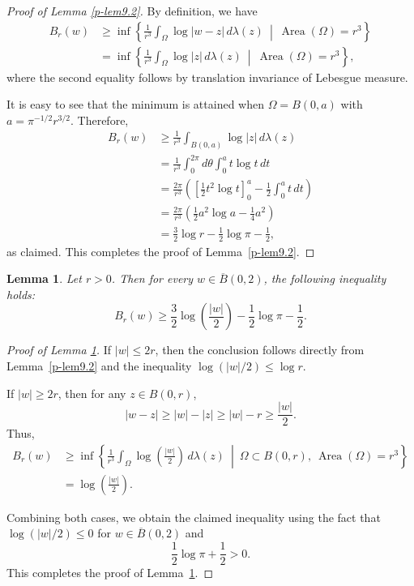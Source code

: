 \documentclass[12pt,twoside]{amsart}
\DeclareMathOperator{\Area}{Area}
\newtheorem{lem}[thm]{Lemma}
\theoremstyle{definition}
\begin{document}
\begin{proof}[Proof of Lemma \ref{p-lem9.2}]
By definition, we have
\begin{align*}
B_r(w)
&\ge
\inf\left\{
\frac{1}{r^3} \int_{\Omega} \log |w - z| \, d\lambda(z)
\ \middle| \ 
\Area(\Omega) = r^3
\right\} \\
&=
\inf\left\{
\frac{1}{r^3} \int_{\Omega} \log |z| \, d\lambda(z)
\ \middle| \
\Area(\Omega) = r^3
\right\},
\end{align*}
where the second equality follows by translation invariance of Lebesgue measure.

It is easy to see 
that the minimum is attained when $\Omega = B(0,a)$ with $a = \pi^{-1/2} r^{3/2}$. Therefore,
\[
\begin{aligned}
B_r(w)
&\ge
\frac{1}{r^3} \int_{B(0, a)} \log |z| \, d\lambda(z) \\
&=
\frac{1}{r^3} \int_0^{2\pi} d\theta \int_0^a t \log t \, dt \\
&=
\frac{2\pi}{r^3} \left( \left[ \frac{1}{2} t^2 \log t \right]_0^a - \frac{1}{2} 
\int_0^a t \, dt \right) \\
&=
\frac{2\pi}{r^3} \left( \frac{1}{2} a^2 \log a - \frac{1}{4} a^2 \right) \\
&=
\frac{3}{2} \log r - \frac{1}{2} \log \pi - \frac{1}{2},
\end{aligned}
\]
as claimed. This completes the proof of Lemma~\ref{p-lem9.2}.
\end{proof}

\begin{lem}
\label{p-lem9.3}
Let $r > 0$. Then for every $w \in \overline{B}(0, 2)$, the following inequality holds:
\[
B_r(w)
\ge
\frac{3}{2} \log \left( \frac{|w|}{2} \right) - \frac{1}{2} \log \pi - \frac{1}{2}.
\]
\end{lem}

\begin{proof}[Proof of Lemma \ref{p-lem9.3}]
If $|w| \le 2r$, then the conclusion 
follows directly from Lemma~\ref{p-lem9.2} and the inequality $\log(|w|/2) \le \log r$.

If $|w| \ge 2r$, then for any $z \in B(0, r)$,
\[
|w - z| \ge |w| - |z| \ge |w| - r \ge \frac{|w|}{2}.
\]
Thus,
\[
\begin{aligned}
B_r(w)
&\ge
\inf\left\{
\frac{1}{r^3} \int_{\Omega} \log\left( \frac{|w|}{2} \right) \, d\lambda(z)
\ \middle| \
\Omega \subset B(0, r),\ \Area(\Omega) = r^3
\right\} \\
&=
\log\left( \frac{|w|}{2} \right).
\end{aligned}
\]

Combining both cases, we obtain the claimed 
inequality using the fact that 
$\log(|w|/2) \le 0$ for $w \in \overline{B}(0,2)$ and
\[
\frac{1}{2} \log \pi + \frac{1}{2} > 0.
\]
This completes the proof of Lemma~\ref{p-lem9.3}.
\end{proof}
\end{document}
